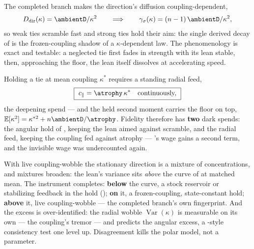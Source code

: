 \documentclass[../main]{subfiles}
\begin{document}
\begin{theorem}%
  The completed branch makes the direction's diffusion coupling-dependent,
  \begin{equation}
    D_{\mathrm{dir}}(\kappa)=\ambientD/\kappa^{2}
    \qquad\Longrightarrow\qquad
    \gamma_{\sigma}(\kappa)=(n-1)\,\ambientD/\kappa^{2},
    \label{eq:dyn:scramble}
  \end{equation}
  so weak ties scramble fast and strong ties hold their aim: the single derived decay
  of  is the frozen-coupling shadow of a $\kappa$-dependent law. The
  phenomenology is exact and testable: a neglected tie first fades in strength with
  its lean stable, then, approaching the floor, the lean itself dissolves at
  accelerating speed.
\end{theorem}


\begin{theorem}%
  Holding a tie at mean coupling $\kappa^{*}$ requires a standing radial feed,
  \begin{equation}
    \boxed{\ c_{\parallel}=\atrophy\,\kappa^{*}\quad\text{continuously,}\ }
    \label{eq:dyn:radial}
  \end{equation}
  the deepening spend --- and the held second moment carries the floor on top,
  $\mathbb E[\kappa^{2}]=\kappa^{*2}+n\ambientD/\atrophy$. Fidelity therefore has
  \textbf{two} dark spends: the angular hold of , keeping the lean aimed
  against scramble, and the radial feed, keeping the coupling fed against atrophy ---
  's wage gains a second term, and the invisible wage was undercounted
  again.
\end{theorem}

\begin{corollary}
  With live coupling-wobble the stationary direction is a mixture of concentrations,
  and mixtures broaden: the lean's variance sits \emph{above} the curve of
   at matched mean. The instrument completes: \textbf{below}
  the curve, a stock reservoir or stabilizing feedback in the hold
  (); \textbf{on} it, a frozen-coupling, state-constant hold;
  \textbf{above} it, live coupling-wobble --- the completed branch's own fingerprint.
  And the excess is over-identified: the radial wobble
  $\operatorname{Var}(\kappa)$ is measurable on its own --- the coupling's tremor ---
  and predicts the angular excess, a -style consistency test one
  level up. Disagreement kills the polar model, not a parameter.
\end{corollary}
\end{document}

